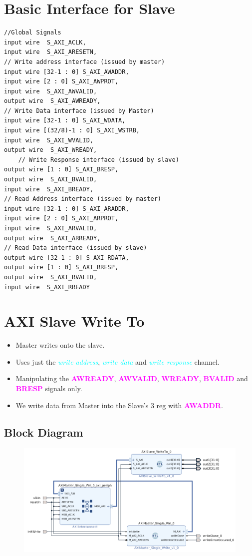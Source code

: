 \documentclass{article}
\newcommand{\chFormat}[1]{\emph{\textcolor{cyan}{#1}}}
\newcommand{\AXISignals}[1]{\textbf{\textcolor{magenta}{#1}}}
\begin{document}
\section{Basic Interface for Slave}
\begin{verbatim}
//Global Signals
input wire  S_AXI_ACLK,
input wire  S_AXI_ARESETN,
// Write address interface (issued by master)
input wire [32-1 : 0] S_AXI_AWADDR,
input wire [2 : 0] S_AXI_AWPROT,
input wire  S_AXI_AWVALID,
output wire  S_AXI_AWREADY, 
// Write Data interface (issued by Master)
input wire [32-1 : 0] S_AXI_WDATA,
input wire [(32/8)-1 : 0] S_AXI_WSTRB,
input wire  S_AXI_WVALID,
output wire  S_AXI_WREADY,
    // Write Response interface (issued by slave)
output wire [1 : 0] S_AXI_BRESP,
output wire  S_AXI_BVALID,
input wire  S_AXI_BREADY,     
// Read Address interface (issued by master)
input wire [32-1 : 0] S_AXI_ARADDR,
input wire [2 : 0] S_AXI_ARPROT,
input wire  S_AXI_ARVALID,
output wire  S_AXI_ARREADY,
// Read Data interface (issued by slave)
output wire [32-1 : 0] S_AXI_RDATA,
output wire [1 : 0] S_AXI_RRESP,
output wire  S_AXI_RVALID,
input wire  S_AXI_RREADY
\end{verbatim}


\section{AXI Slave Write To}
\begin{itemize}
    \item Master writes onto the slave.
    \item Uses just the \chFormat{write address}, \chFormat{write data} and \chFormat{write response} channel.
    \item Manipulating the \AXISignals{AWREADY}, \AXISignals{AWVALID}, \AXISignals{WREADY}, \AXISignals{BVALID} and \AXISignals{BRESP} signals only.
    \item We write data from Master into the Slave's 3 reg with \AXISignals{AWADDR}.
\end{itemize}
\subsection{Block Diagram}
\begin{figure}[H]
    \centering
    \includegraphics[width=1\textwidth]{Resources/SlaveWriteTo3Reg.png}
\end{figure}
\end{document}
